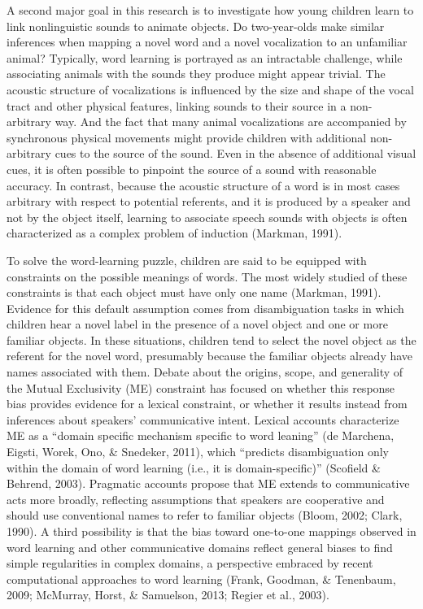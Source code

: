 \documentclass[english,floatsintext,man]{apa6}
\theoremstyle{definition}
\theoremstyle{definition}
\theoremstyle{definition}
\theoremstyle{remark}
\begin{document}
A second major goal in this research is to investigate how young
children learn to link nonlinguistic sounds to animate objects. Do
two-year-olds make similar inferences when mapping a novel word and a
novel vocalization to an unfamiliar animal? Typically, word learning is
portrayed as an intractable challenge, while associating animals with
the sounds they produce might appear trivial. The acoustic structure of
vocalizations is influenced by the size and shape of the vocal tract and
other physical features, linking sounds to their source in a
non-arbitrary way. And the fact that many animal vocalizations are
accompanied by synchronous physical movements might provide children
with additional non-arbitrary cues to the source of the sound. Even in
the absence of additional visual cues, it is often possible to pinpoint
the source of a sound with reasonable accuracy. In contrast, because the
acoustic structure of a word is in most cases arbitrary with respect to
potential referents, and it is produced by a speaker and not by the
object itself, learning to associate speech sounds with objects is often
characterized as a complex problem of induction (Markman, 1991).

To solve the word-learning puzzle, children are said to be equipped with
constraints on the possible meanings of words. The most widely studied
of these constraints is that each object must have only one name
(Markman, 1991). Evidence for this default assumption comes from
disambiguation tasks in which children hear a novel label in the
presence of a novel object and one or more familiar objects. In these
situations, children tend to select the novel object as the referent for
the novel word, presumably because the familiar objects already have
names associated with them. Debate about the origins, scope, and
generality of the Mutual Exclusivity (ME) constraint has focused on
whether this response bias provides evidence for a lexical constraint,
or whether it results instead from inferences about speakers'
communicative intent. Lexical accounts characterize ME as a
\enquote{domain specific mechanism specific to word leaning} (de
Marchena, Eigsti, Worek, Ono, \& Snedeker, 2011), which
\enquote{predicts disambiguation only within the domain of word learning
(i.e., it is domain-specific)} (Scofield \& Behrend, 2003). Pragmatic
accounts propose that ME extends to communicative acts more broadly,
reflecting assumptions that speakers are cooperative and should use
conventional names to refer to familiar objects (Bloom, 2002; Clark,
1990). A third possibility is that the bias toward one-to-one mappings
observed in word learning and other communicative domains reflect
general biases to find simple regularities in complex domains, a
perspective embraced by recent computational approaches to word learning
(Frank, Goodman, \& Tenenbaum, 2009; McMurray, Horst, \& Samuelson,
2013; Regier et al., 2003).
\end{document}
